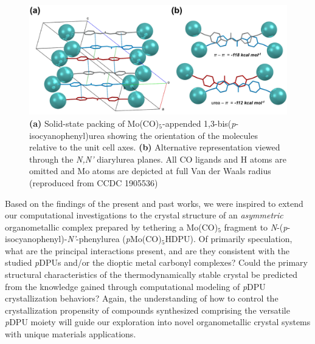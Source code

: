 \begin{figure}[h!]
    \centering
    \includegraphics[width=0.8\linewidth]{figures/pub3/Picture7.png}
    \caption[\textbf{(a)} Solid-state packing of Mo(CO)$_{5}$-appended 1,3-bis(\textit{p}-isocyanophenyl)urea showing the orientation of the molecules relative to the unit cell axes. \textbf{(b)} Alternative representation viewed through the \textit{N,N'} diarylurea planes. All CO ligands and H atoms are omitted and Mo atoms are depicted at full Van der Waals radius (reproduced from CCDC 1905536)]{\textbf{(a)} Solid-state packing of Mo(CO)$_{5}$-appended 1,3-bis(\textit{p}-isocyanophenyl)urea showing the orientation of the molecules relative to the unit cell axes. \textbf{(b)} Alternative representation viewed through the \textit{N,N'} diarylurea planes. All CO ligands and H atoms are omitted and Mo atoms are depicted at full Van der Waals radius (reproduced from CCDC 1905536) \citep{Millard2019a}}\label{fig:solid-state-packing}
\end{figure}

Based on the findings of the present and past works, we were inspired to extend our computational investigations to the crystal structure of an \textit{asymmetric} organometallic complex prepared by tethering a Mo(CO)$_{5}$ fragment to \textit{N}-(\textit{p}-isocyanophenyl)-\textit{N'}-phenylurea (\textit{p}Mo(CO)$_{5}$HDPU). Of primarily speculation, what are the principal interactions present, and are they consistent with the studied \textit{p}DPUs and/or the dioptic metal carbonyl complexes? Could the primary structural characteristics of the thermodynamically stable crystal be predicted from the knowledge gained through computational modeling of \textit{p}DPU crystallization behaviors? Again, the understanding of how to control the crystallization propensity of compounds synthesized comprising the versatile \textit{p}DPU moiety will guide our exploration into novel organometallic crystal systems with unique materials applications.



